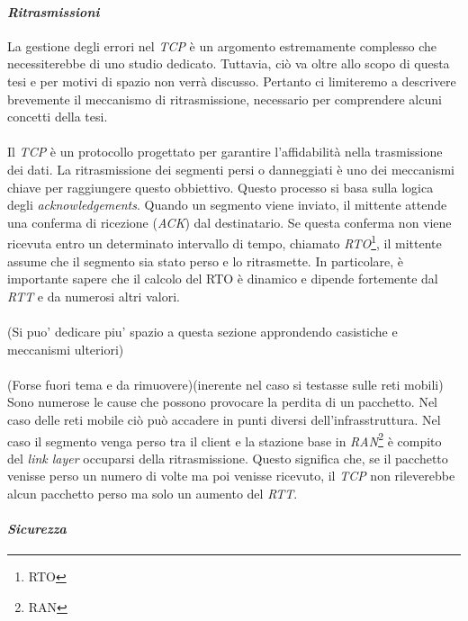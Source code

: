 \paragraph{\textit{Ritrasmissioni}}

\noindent La gestione degli errori nel \emph{TCP} è un argomento estremamente complesso che necessiterebbe di uno studio dedicato. 
Tuttavia, ciò va oltre allo scopo di questa tesi e per motivi di spazio non verrà discusso. Pertanto ci limiteremo a descrivere brevemente il meccanismo di ritrasmissione, necessario per comprendere alcuni concetti della tesi.
\\\\
\noindent Il \emph{TCP} è un protocollo progettato per garantire l'affidabilità nella trasmissione dei dati. La ritrasmissione dei segmenti persi o danneggiati è uno dei meccanismi chiave per raggiungere questo obbiettivo. Questo processo si basa sulla logica degli \emph{acknowledgements}. Quando un segmento viene inviato, il mittente attende una conferma di ricezione (\emph{ACK}) dal destinatario. Se questa conferma non viene ricevuta entro un determinato intervallo di tempo, chiamato \emph{RTO}\footnote{\gls{RTO}}, il mittente assume che il segmento sia stato perso e lo ritrasmette.
In particolare, è importante sapere che il calcolo del RTO è dinamico e dipende fortemente dal \emph{RTT} e da numerosi altri valori. 
\\\\
\noindent(Si puo' dedicare piu' spazio a questa sezione approndendo casistiche e meccanismi ulteriori)
\\\\
\noindent(Forse fuori tema e da rimuovere)(inerente nel caso si testasse sulle reti mobili)
\\
Sono numerose le cause che possono provocare la perdita di un pacchetto. Nel caso delle reti mobile ciò può accadere in punti diversi dell'infrasstruttura. Nel caso il segmento venga perso tra il client e la stazione base in \emph{RAN}\footnote{\gls{RAN}} è compito del \emph{link layer} occuparsi della ritrasmissione. Questo significa che, se il pacchetto venisse perso un numero di volte ma poi venisse ricevuto, il \emph{TCP} non rileverebbe alcun pacchetto perso ma solo un aumento del \emph{RTT}.
\paragraph{\textit{Sicurezza}}

